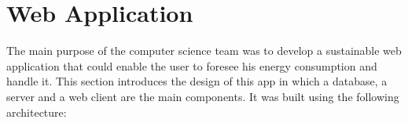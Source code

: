 %
%
\section{Web Application}

The main purpose of the computer science team was to develop a sustainable web application that could enable the user to foresee his energy consumption and handle it.  This section introduces the design of this app in which a database, a server and a web client are the main components. It was built using the following architecture:

    \begin{figure}[!h] %
        \centering
    \end{figure}
%





